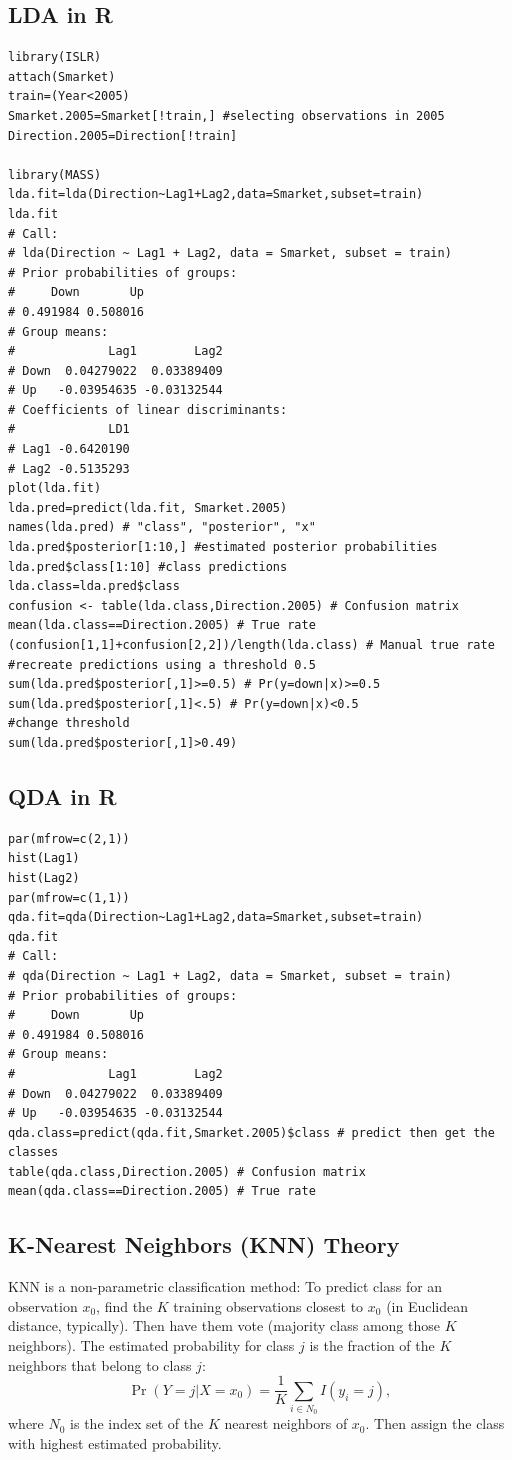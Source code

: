\documentclass[11pt]{article}
\begin{document}
\subsection{LDA in R}
\begin{lstlisting}
library(ISLR)
attach(Smarket)
train=(Year<2005)
Smarket.2005=Smarket[!train,] #selecting observations in 2005
Direction.2005=Direction[!train]

library(MASS)
lda.fit=lda(Direction~Lag1+Lag2,data=Smarket,subset=train)
lda.fit
# Call:
# lda(Direction ~ Lag1 + Lag2, data = Smarket, subset = train)
# Prior probabilities of groups:
#     Down       Up 
# 0.491984 0.508016 
# Group means:
#             Lag1        Lag2
# Down  0.04279022  0.03389409
# Up   -0.03954635 -0.03132544
# Coefficients of linear discriminants:
#             LD1
# Lag1 -0.6420190
# Lag2 -0.5135293
plot(lda.fit)
lda.pred=predict(lda.fit, Smarket.2005)
names(lda.pred) # "class", "posterior", "x"
lda.pred$posterior[1:10,] #estimated posterior probabilities
lda.pred$class[1:10] #class predictions
lda.class=lda.pred$class
confusion <- table(lda.class,Direction.2005) # Confusion matrix
mean(lda.class==Direction.2005) # True rate
(confusion[1,1]+confusion[2,2])/length(lda.class) # Manual true rate
#recreate predictions using a threshold 0.5
sum(lda.pred$posterior[,1]>=0.5) # Pr(y=down|x)>=0.5
sum(lda.pred$posterior[,1]<.5) # Pr(y=down|x)<0.5
#change threshold
sum(lda.pred$posterior[,1]>0.49)
\end{lstlisting}

\subsection{QDA in R}
\begin{lstlisting}
par(mfrow=c(2,1))
hist(Lag1)
hist(Lag2)
par(mfrow=c(1,1))
qda.fit=qda(Direction~Lag1+Lag2,data=Smarket,subset=train)
qda.fit
# Call:
# qda(Direction ~ Lag1 + Lag2, data = Smarket, subset = train)
# Prior probabilities of groups:
#     Down       Up 
# 0.491984 0.508016 
# Group means:
#             Lag1        Lag2
# Down  0.04279022  0.03389409
# Up   -0.03954635 -0.03132544
qda.class=predict(qda.fit,Smarket.2005)$class # predict then get the classes
table(qda.class,Direction.2005) # Confusion matrix
mean(qda.class==Direction.2005) # True rate
\end{lstlisting}

\subsection{K-Nearest Neighbors (KNN) Theory}
KNN is a non-parametric classification method:
To predict class for an observation $x_0$, find the $K$ training observations closest to $x_0$ (in Euclidean distance, typically). Then have them vote (majority class among those $K$ neighbors). The estimated probability for class $j$ is the fraction of the $K$ neighbors that belong to class $j$:
\[ \Pr(Y=j|X=x_0) = \frac{1}{K} \sum_{i \in N_0} I(y_i = j), \] 
where $N_0$ is the index set of the $K$ nearest neighbors of $x_0$. Then assign the class with highest estimated probability.
\end{document}
